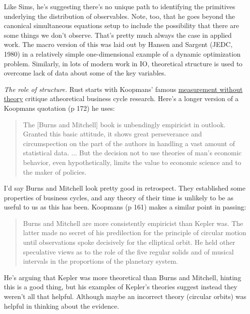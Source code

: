 \documentclass[11pt,letterpaper]{article}
\begin{document}
%
Like Sims, he's suggesting there's no unique path to identifying
the primitives underlying the distribution of observables.
Note, too, that he goes beyond the canonical simultaneous equations setup
to include the possibility that there are some things we don't observe.
That's pretty much always the case in applied work.
The macro version of this was laid out by Hansen and Sargent (JEDC, 1980)
in a relatively simple one-dimensional example of a dynamic optimization problem.
Similarly, in lots of modern work in IO,
theoretical structure is used to overcome lack of data about
some of the key variables.


{\it The role of structure.\/}
Rust starts with Koopmans' famous
\href{http://elaine.ihs.ac.at/~blume/koopmansres.pdf}{measurement without theory}
critique atheoretical business cycle research.
Here's a longer version of a  Koopmans quotation (p 172) he uses:
\begin{quote}
The [Burns and Mitchell]
book is unbendingly empiricist in outlook. Granted this basic attitude,
it shows great perseverance and circumspection
on the part of the authors in handling a vast
amount of statistical data. ...
But the decision not to use theories of man's economic behavior,
even hypothetically, limits the value to economic science and to the maker of policies.
\end{quote}
%
I'd say Burns and Mitchell look pretty good in retrospect.
They established some properties of business cycles,
and any theory of their time is unlikely to be as useful to us as this has been.
Koopmans (p 161) makes a similar point in passing:
\begin{quote}
Burns and Mitchell are more consistently empiricist than Kepler was.
The latter made no secret of his predilection for the
principle of circular motion until observations
spoke decisively for the elliptical orbit. He
held other speculative views as to the role of
the five regular solids and of musical intervals
in the proportions of the planetary system.
\end{quote}
He's arguing that Kepler was more theoretical than Burns and Mitchell,
hinting this is a good thing,
but his examples of Kepler's theories suggest instead they weren't all that helpful.
Although maybe an incorrect theory (circular orbits) was helpful
in thinking about the evidence.
\end{document}

